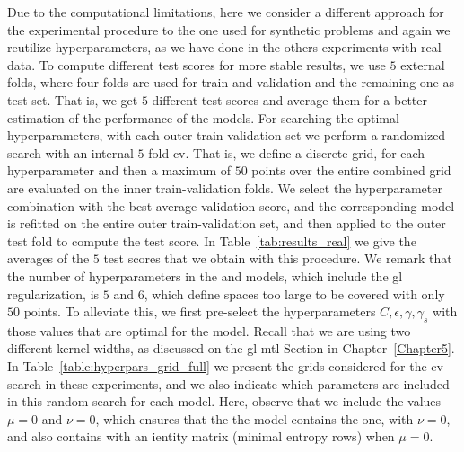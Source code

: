 Due to the computational limitations, here we consider a different approach for the experimental procedure to the one used for synthetic problems and again we reutilize hyperparameters, as we have done in the others experiments with real data.
To compute different test scores for more stable results, we use $5$ external folds, where four folds are used for train and validation and the remaining one as test set.
That is, we get $5$ different test scores and average them for a better estimation of the performance of the models. 
%
For searching the optimal hyperparameters, with each outer train-validation set we perform a randomized search with an internal $5$-fold \acrshort{cv}. That is, we define a discrete grid, for each hyperparameter and then a maximum of $50$ points over the entire combined grid are evaluated on the inner train-validation folds.
%
We select the hyperparameter combination with the best average validation score, and the corresponding model is refitted on the entire outer train-validation set, and then applied to the outer test fold to compute the test score. In Table~\ref{tab:results_real} we give the averages of the $5$ test scores that we obtain with this procedure.
%
We remark that the number of hyperparameters in the  and  models, which include the \acrshort{gl} regularization, is $5$ and $6$, which define spaces too large to be covered with only $50$ points. To alleviate this, we first pre-select the hyperparameters $C, \epsilon, \gamma, \gamma_s$ with those values that are optimal for the  model. Recall that we are using two different kernel widths, as discussed on the \acrshort{gl} \acrshort{mtl} Section in Chapter~\ref{Chapter5}.
%
In Table~\ref{table:hyperpars_grid_full} we present the grids considered for the \acrshort{cv} search in these experiments, and we also indicate which parameters are included in this random search for each model.
Here, observe that we include the values $\mu=0$ and $\nu=0$, which ensures that the the  model contains the  one, with $\nu=0$, and also  contains  with an ientity matrix (minimal entropy rows) when $\mu=0$.
%

